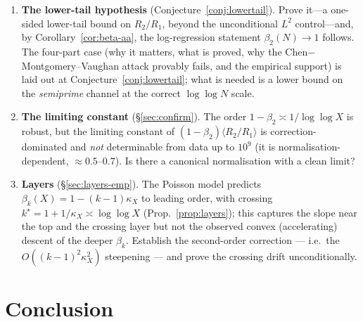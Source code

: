 \documentclass[]{interact}%
\begin{document}
\begin{enumerate}[leftmargin=2em,itemsep=2pt]
\item \textbf{The lower-tail hypothesis} (Conjecture~\ref{conj:lowertail}). Prove it---a one-sided
lower-tail bound on $R_2/R_1$, beyond the unconditional $L^2$ control---and, by
Corollary~\ref{cor:beta-aa}, the log-regression statement $\beta_2(N)\to1$ follows. The four-part
case (why it matters, what is proved, why the Chen$-$Montgomery--Vaughan attack provably fails,
and the empirical support) is laid out at Conjecture~\ref{conj:lowertail}; what is needed is a
lower bound on the \emph{semiprime} channel at the correct $\log\log N$ scale.
\item \textbf{The limiting constant} (\S\ref{sec:confirm}). The order $1-\beta_2\asymp1/\log\log X$
is robust, but the limiting constant of $(1-\beta_2)\langle R_2/R_1\rangle$ is correction-dominated
and \emph{not} determinable from data up to $10^{9}$ (it is normalisation-dependent, $\approx0.5$--$0.7$).
Is there a canonical normalisation with a clean limit?
\item \textbf{Layers} (\S\ref{sec:layers-emp}). The Poisson model predicts
$\beta_k(X)=1-(k-1)\kappa_X$ to leading order, with crossing $k^\star=1+1/\kappa_X\asymp\log\log X$
(Prop.~\ref{prop:layers}); this captures the slope near the top and the crossing layer but
not the observed convex (accelerating) descent of the deeper $\beta_k$. Establish the
second-order correction --- i.e.\ the $O((k-1)^2\kappa_X^2)$ steepening --- and prove the
crossing drift unconditionally.
\end{enumerate}

\section{Conclusion}
\end{document}
